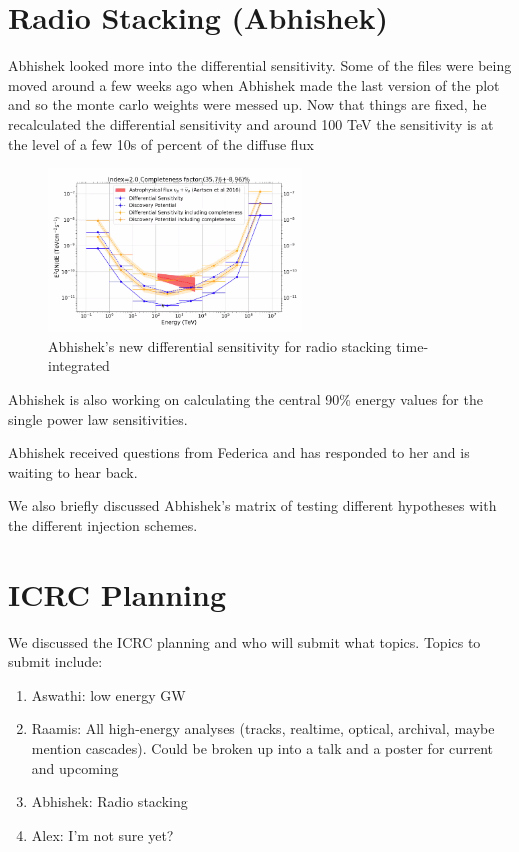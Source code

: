 \section{Radio Stacking (Abhishek)}
Abhishek looked more into the differential sensitivity. Some of the files were being moved around a few weeks ago when Abhishek made the last version of the plot and so the monte carlo weights were messed up. Now that things are fixed, he recalculated the differential sensitivity and around 100 TeV the sensitivity is at the level of a few 10s of percent of the diffuse flux

\begin{figure}[h]
    \centering
    \includegraphics[width=0.6\textwidth]{images/abhishek_plot_011221.png}
    \caption{Abhishek's new differential sensitivity for radio stacking time-integrated}
    \label{fig:my_label}
\end{figure}

Abhishek is also working on calculating the central 90\% energy values for the single power law sensitivities.

Abhishek received questions from Federica and has responded to her and is waiting to hear back.

We also briefly discussed Abhishek's matrix of testing different hypotheses with the different injection schemes.

\section{ICRC Planning}
We discussed the ICRC planning and who will submit what topics. Topics to submit include:
\begin{enumerate}
    \item Aswathi: low energy GW
    \item Raamis: All high-energy analyses (tracks, realtime, optical, archival, maybe mention cascades). Could be broken up into a talk and a poster for current and upcoming
    \item Abhishek: Radio stacking
    \item Alex: I'm not sure yet?
\end{enumerate}